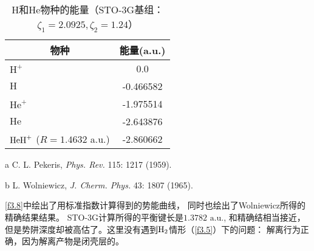 \begin{table}[h]
\begin{threeparttable}
	\begin{tabular}{lc}
		\hline
		\multicolumn{1}{c}{物种} & 能量(a.u.)  \\ \hline
		$\text{H}^+$             &    0.0    \\
		$\text{H}$               & -0.466582 \\
		$\text{He}^+$            & -1.975514 \\
		$\text{He}$              & -2.643876\tnote{a} \\
		$\mathrm{HeH}^+$ ($R=1.4632$ a.u.) & -2.860662\tnote{b} \\ \hline
	\end{tabular}
	\begin{tablenotes}
		\item[a] C. L. Pekeris, \textit{Phys. Rev.} 115: 1217 (1959).
		\item[b] L. Wolniewicz, \textit{J. Cherm. Phys.} 43: 1807 (1965).
	\end{tablenotes}
\end{threeparttable}
	\centering\caption{$\text{H}$和$\text{He}$物种的能量（STO-3G基组： $\zeta_1=2.0925,\zeta_2=1.24$）}
	\label{t3.6}
\end{table}
\ref{f3.8}中绘出了用标准指数计算得到的势能曲线， 同时也绘出了Wolniewicz所得的精确结果结果。 STO-3G计算所得的平衡键长是$1.3782\,\,\text{a.u.}$, 和精确结相当接近，但是势阱深度却被高估了。这里没有遇到$\mathrm{H}_2$情形（\ref{f3.5}）下的问题： 解离行为正确，因为解离产物是闭壳层的。

